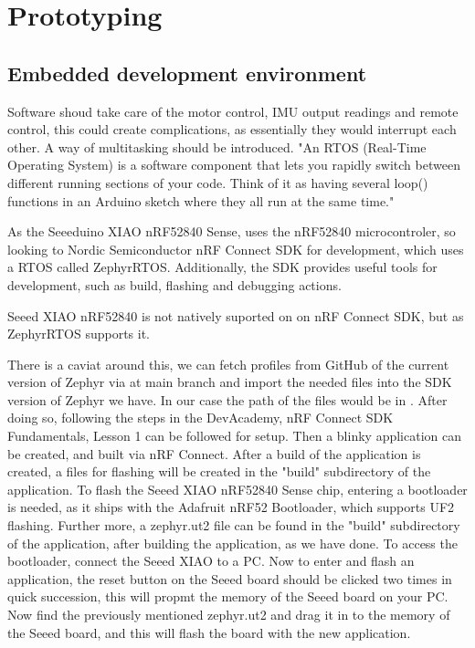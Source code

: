\documentclass[a4paper,11pt]{article}
\begin{document}
\section{Prototyping}
\subsection{Embedded development environment}

Software shoud take care of the motor control, IMU output readings and remote control, this could create complications, as essentially they would interrupt each other. A way of multitasking should be introduced. 
"An RTOS (Real-Time Operating System) is a software component that lets you rapidly switch between different running sections of your code. Think of it as having several loop() functions in an Arduino sketch where they all run at the same time." \cite{Joe2019}

As the Seeeduino XIAO nRF52840 Sense, uses the nRF52840 microcontroler, so looking to Nordic Semiconductor nRF Connect SDK for development, which uses a RTOS called ZephyrRTOS.
Additionally, the SDK provides useful tools for development, such as build, flashing and debugging actions. \cite{nRF}


Seeed XIAO nRF52840 is not natively suported on on nRF Connect SDK, but as ZephyrRTOS supports it. \cite{docsZephyr}

There is a caviat around this, we can fetch profiles from GitHub of the current version of Zephyr via  at main branch \cite{gitZephyr} and import the needed files into the SDK version of Zephyr we have.
In our case the path of the files would be in  .
After doing so, following the steps in the DevAcademy, nRF Connect SDK Fundamentals, Lesson 1 can be followed for setup. Then a blinky application can be created, and built via nRF Connect.
After a build of the application is created, a files for flashing will be created in the "build" subdirectory of the application.
To flash the Seeed XIAO nRF52840 Sense chip, entering a bootloader is needed, as it ships with the Adafruit nRF52 Bootloader, which supports UF2 flashing.
Further more, a zephyr.ut2 file can be found in the "build" subdirectory of the application, after building the application, as we have done.
To access the bootloader, connect the Seeed XIAO to a PC.
Now to enter and flash an application, the reset button on the Seeed board should be clicked two times in quick succession, this will propmt the memory of the Seeed board on your PC.
Now find the previously mentioned zephyr.ut2 and drag it in to the memory of the Seeed board, and this will flash the board with the new application.
\end{document}
